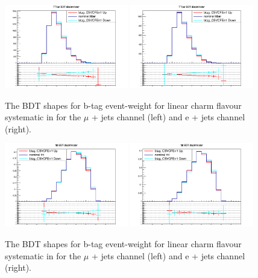 \begin{figure}[ht!]
    \includegraphics[width=0.48\textwidth]{images/Run2/Sys/btag_CSVCFErr1systt.png}
    \includegraphics[width=0.48\textwidth]{images/Run2/Sys/btag_CSVCFErr1systt_e.png}     
    \caption{The BDT shapes for b-tag event-weight for linear charm flavour systematic in \ttbar for the $\mu$ + jets channel (left) and e + jets channel (right).}
    \label{fig:SysShapesCFErrtt1}
\end{figure}
\begin{figure}[ht!]
    \includegraphics[width=0.48\textwidth]{images/Run2/Sys/btag_CSVCFErr1systttt.png}
    \includegraphics[width=0.48\textwidth]{images/Run2/Sys/btag_CSVCFErr1systttt_e.png}     
    \caption{The BDT shapes for b-tag event-weight for linear charm flavour systematic in \tttt for the $\mu$ + jets channel (left) and e + jets channel (right).}
    \label{fig:SysShapesCFErrtttt1}
\end{figure}
